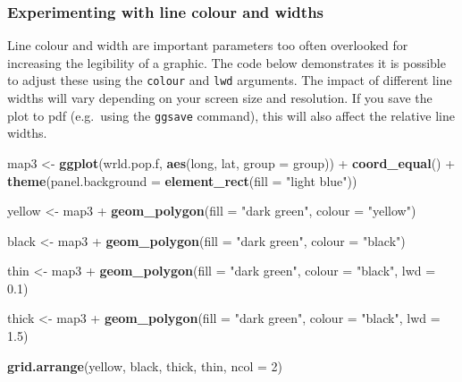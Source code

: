 \documentclass[]{article}
\newenvironment{Shaded}{}{}
\newcommand{\KeywordTok}[1]{\textcolor[rgb]{0.00,0.44,0.13}{\textbf{{#1}}}}
\newcommand{\DataTypeTok}[1]{\textcolor[rgb]{0.56,0.13,0.00}{{#1}}}
\newcommand{\DecValTok}[1]{\textcolor[rgb]{0.25,0.63,0.44}{{#1}}}
\newcommand{\FloatTok}[1]{\textcolor[rgb]{0.25,0.63,0.44}{{#1}}}
\newcommand{\StringTok}[1]{\textcolor[rgb]{0.25,0.44,0.63}{{#1}}}
\newcommand{\NormalTok}[1]{{#1}}
\begin{document}
\subsubsection{Experimenting with line colour and widths}

Line colour and width are important parameters too often overlooked for
increasing the legibility of a graphic. The code below demonstrates it
is possible to adjust these using the \texttt{colour} and \texttt{lwd}
arguments. The impact of different line widths will vary depending on
your screen size and resolution. If you save the plot to pdf (e.g.~using
the \texttt{ggsave} command), this will also affect the relative line
widths.

\begin{Shaded}
\begin{Highlighting}[]
\NormalTok{map3 <- }\KeywordTok{ggplot}\NormalTok{(wrld.pop.f, }\KeywordTok{aes}\NormalTok{(long, lat, }\DataTypeTok{group =} \NormalTok{group)) + }\KeywordTok{coord_equal}\NormalTok{() + }
    \KeywordTok{theme}\NormalTok{(}\DataTypeTok{panel.background =} \KeywordTok{element_rect}\NormalTok{(}\DataTypeTok{fill =} \StringTok{"light blue"}\NormalTok{))}

\NormalTok{yellow <- map3 + }\KeywordTok{geom_polygon}\NormalTok{(}\DataTypeTok{fill =} \StringTok{"dark green"}\NormalTok{, }\DataTypeTok{colour =} \StringTok{"yellow"}\NormalTok{)}

\NormalTok{black <- map3 + }\KeywordTok{geom_polygon}\NormalTok{(}\DataTypeTok{fill =} \StringTok{"dark green"}\NormalTok{, }\DataTypeTok{colour =} \StringTok{"black"}\NormalTok{)}

\NormalTok{thin <- map3 + }\KeywordTok{geom_polygon}\NormalTok{(}\DataTypeTok{fill =} \StringTok{"dark green"}\NormalTok{, }\DataTypeTok{colour =} \StringTok{"black"}\NormalTok{, }\DataTypeTok{lwd =} \FloatTok{0.1}\NormalTok{)}

\NormalTok{thick <- map3 + }\KeywordTok{geom_polygon}\NormalTok{(}\DataTypeTok{fill =} \StringTok{"dark green"}\NormalTok{, }\DataTypeTok{colour =} \StringTok{"black"}\NormalTok{, }\DataTypeTok{lwd =} \FloatTok{1.5}\NormalTok{)}

\KeywordTok{grid.arrange}\NormalTok{(yellow, black, thick, thin, }\DataTypeTok{ncol =} \DecValTok{2}\NormalTok{)}
\end{Highlighting}
\end{Shaded}
\end{document}
